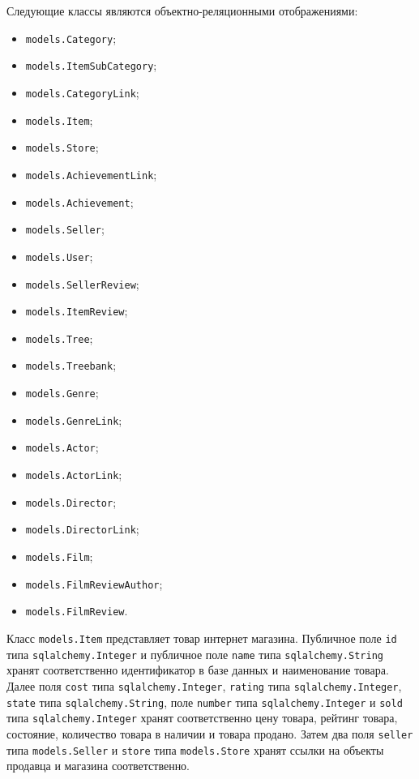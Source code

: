 Следующие классы являются объектно-реляционными отображениями:
\begin{itemize}
\item \texttt{mo\-dels.Category};
\item \texttt{mo\-dels.ItemSubCategory};
\item \texttt{mo\-dels.CategoryLink};
\item \texttt{mo\-dels.Item};
\item \texttt{mo\-dels.Store};
\item \texttt{mo\-dels.AchievementLink};
\item \texttt{mo\-dels.Achievement};
\item \texttt{mo\-dels.Seller};
\item \texttt{mo\-dels.User};
\item \texttt{mo\-dels.SellerReview};
\item \texttt{mo\-dels.ItemReview};
\item \texttt{mo\-dels.Tree};
\item \texttt{mo\-dels.Treebank};
\item \texttt{mo\-dels.Genre};
\item \texttt{mo\-dels.GenreLink};
\item \texttt{mo\-dels.Actor};
\item \texttt{mo\-dels.ActorLink};
\item \texttt{mo\-dels.Director};
\item \texttt{mo\-dels.DirectorLink};
\item \texttt{mo\-dels.Film};
\item \texttt{mo\-dels.FilmReviewAuthor};
\item \texttt{mo\-dels.FilmReview}.
\end{itemize}

Класс \texttt{mo\-dels.Item} представляет товар интернет магазина. Публичное поле \texttt{id} типа \texttt{sqlalchemy.Integer} и публичное поле \texttt{name} типа \texttt{sql\-alchemy.String} хранят соответственно идентификатор в базе данных и наименование товара. Далее поля \texttt{cost} типа \texttt{sqlalchemy.Integer}, \texttt{rat\-ing} типа \texttt{sqlalche\-my.Integer}, \texttt{state} типа \texttt{sqlalchemy.String}, поле \texttt{number} типа \texttt{sqlalchemy.Integer} и \texttt{sold} типа \texttt{sqlalchemy.In\-teger} хранят соответственно цену товара, рейтинг товара, состояние, количество товара в наличии и товара продано. Затем два поля \texttt{seller} типа \texttt{mo\-dels.Seller} и \texttt{store} типа \texttt{mo\-dels.Store} хранят ссылки на объекты продавца и магазина соответственно.


